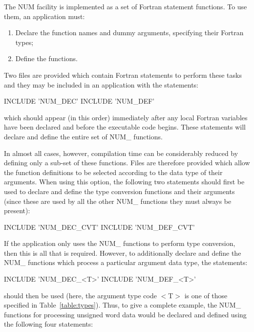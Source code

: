 \documentclass[11pt,nolof]{starlink}
\providecommand{\name}[1]{#1}
\begin{document}
The \name{NUM} facility is implemented as a set of Fortran statement
functions.  To use them, an application must:

\begin{enumerate}

\item Declare the function names and dummy arguments, specifying their
Fortran types;

\item Define the functions.

\end{enumerate}

Two files are provided which contain Fortran statements to perform these
tasks and they may be included in an application with the statements:

\begin{terminalv}
INCLUDE 'NUM_DEC'
INCLUDE 'NUM_DEF'
\end{terminalv}

which should appear (in this order) immediately after any local Fortran
variables have been declared and before the executable code begins.
These statements will declare and define the entire set of \name{NUM\_}
functions.

In almost all cases, however, compilation time can be considerably reduced
by defining only a sub-set of these functions.
Files are therefore provided which allow the function definitions to be
selected according to the data type of their arguments.
When using this option, the following two statements should first be used to
declare and define the type conversion functions and their arguments (since
these are used by all the other \name{NUM\_} functions they must always be
present):

\begin{terminalv}
INCLUDE 'NUM_DEC_CVT'
INCLUDE 'NUM_DEF_CVT'
\end{terminalv}

If the application only uses the \name{NUM\_} functions to perform type
conversion, then this is all that is required.
However, to additionally declare and define the \name{NUM\_} functions which
process a particular argument data type, the statements:

\begin{terminalv}
INCLUDE 'NUM_DEC_<T>'
INCLUDE 'NUM_DEF_<T>'
\end{terminalv}

should then be used (here, the argument type code \name{$<$T$>$} is one of
those specified in Table~\ref{table:types}).
Thus, to give a complete example, the \name{NUM\_} functions for processing
unsigned word data would be declared and defined using the following four
statements:
\end{document}
